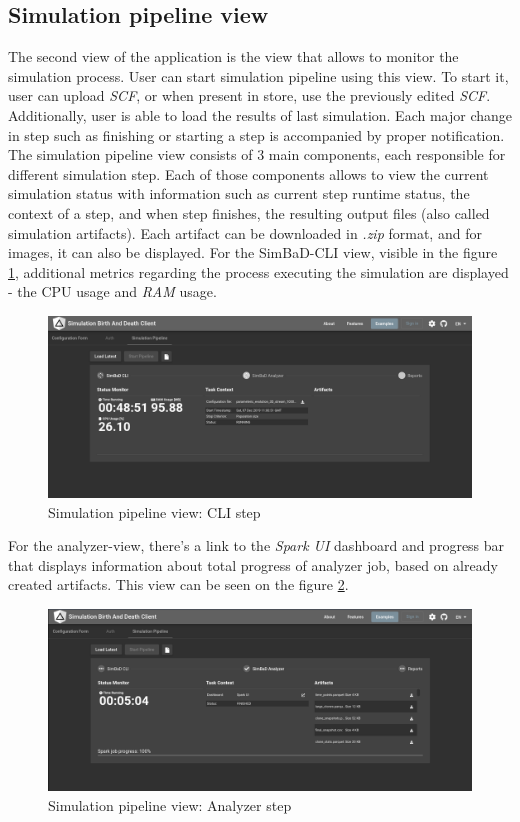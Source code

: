 \subsection{Simulation pipeline view}
The second view of the application is the view that allows to monitor the simulation process. User can start simulation pipeline using this view. To start it, user can upload \textit{SCF}, or when present in store, use the previously edited \textit{SCF}. Additionally, user is able to load the results of last simulation. Each major change in step such as finishing or starting a step is accompanied by proper notification.
The simulation pipeline view consists of 3 main components, each responsible for different simulation step. Each of those components allows to view the current simulation status with information such as current step runtime status, the context of a step, and when step finishes, the resulting output files (also called simulation artifacts). Each artifact can be downloaded in \textit{.zip} format, and for images, it can also be displayed. For the SimBaD-CLI view, visible in the figure \ref{fig:sp-cli}, additional metrics regarding the process executing the simulation are displayed - the CPU usage and \textit{RAM} usage. 
\begin{figure}[h!]
	\centering
		\includegraphics[width=0.9\linewidth]{screens/cli-view.png}
	\caption{Simulation pipeline view: CLI step}
	\label{fig:sp-cli}
\end{figure}
For the analyzer-view, there's a link to the \textit{Spark UI} dashboard and progress bar that displays information about total progress of analyzer job, based on already created artifacts. This view can be seen on the figure \ref{fig:sp-analyzer}.
\begin{figure}[h!]
	\centering
		\includegraphics[width=0.9\linewidth]{screens/analyzer-view.png}
	\caption{Simulation pipeline view: Analyzer step}
	\label{fig:sp-analyzer}
\end{figure}
